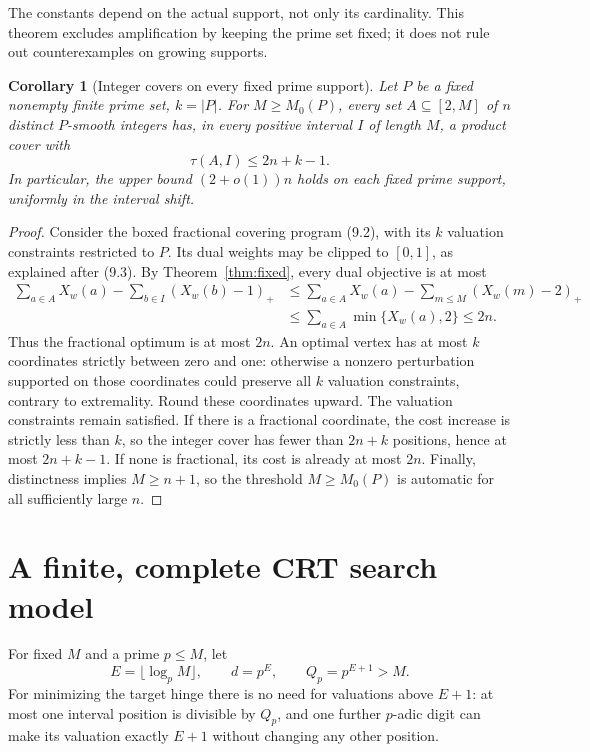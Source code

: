 \documentclass[11pt,a4paper]{article}
\newtheorem{corollary}[theorem]{Corollary}
\theoremstyle{remark}
\newcommand{\pos}[1]{\left(#1\right)_+}
\begin{document}
The constants depend on the actual support, not only its cardinality.
This theorem excludes amplification by keeping the prime set fixed;
it does not rule out counterexamples on growing supports.

\begin{corollary}[Integer covers on every fixed prime support]
\label{cor:fixedinteger}
Let \(P\) be a fixed nonempty finite prime set, \(k=|P|\). For
\(M\ge M_0(P)\), every set \(A\subseteq[2,M]\) of \(n\) distinct
\(P\)-smooth integers has, in every positive interval \(I\) of
length \(M\), a product cover with
\[
 \tau(A,I)\le2n+k-1.
 \tag{7.4}
\]
In particular, the upper bound \((2+o(1))n\) holds on each fixed
prime support, uniformly in the interval shift.
\end{corollary}
\begin{proof}
Consider the boxed fractional covering program (9.2), with its
\(k\) valuation constraints restricted to \(P\). Its dual weights
may be clipped to \([0,1]\), as explained after (9.3). By
Theorem~\ref{thm:fixed}, every dual objective is at most
\[
 \begin{split}
 \sum_{a\in A}X_w(a)-\sum_{b\in I}\pos{X_w(b)-1}
 &\le\sum_{a\in A}X_w(a)-\sum_{m\le M}\pos{X_w(m)-2}\\
 &\le\sum_{a\in A}\min\{X_w(a),2\}\le2n.
 \end{split}
\]
Thus the fractional optimum is at most \(2n\).
An optimal vertex has at most \(k\) coordinates strictly between
zero and one: otherwise a nonzero perturbation supported on those
coordinates could preserve all \(k\) valuation constraints, contrary
to extremality. Round these coordinates upward. The valuation
constraints remain satisfied. If there is a fractional coordinate,
the cost increase is strictly less than \(k\), so the integer cover
has fewer than \(2n+k\) positions, hence at most \(2n+k-1\).
If none is fractional, its cost is already at most \(2n\).
Finally, distinctness implies \(M\ge n+1\), so the threshold
\(M\ge M_0(P)\) is automatic for all sufficiently large \(n\).
\end{proof}

\section{A finite, complete CRT search model}

For fixed \(M\) and a prime \(p\le M\), let
\[
 E=\lfloor\log_pM\rfloor,\qquad d=p^E,\qquad Q_p=p^{E+1}>M.
 \]
For minimizing the target hinge there is no need for valuations above
\(E+1\): at most one interval position is divisible by \(Q_p\), and
one further \(p\)-adic digit can make its valuation exactly \(E+1\)
without changing any other position.
\end{document}
